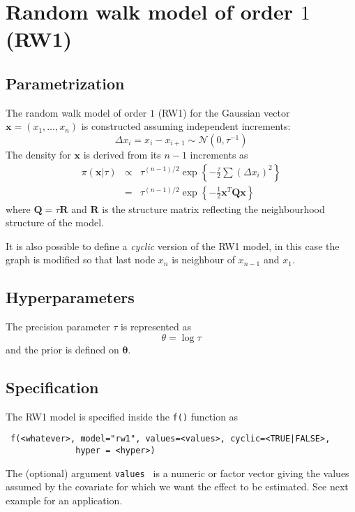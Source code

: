 \documentclass[a4paper,11pt]{article}
\begin{document}
\section*{Random walk model of order $1$ (RW1)}

\subsection*{Parametrization}

The random walk model of order $1$ (RW1) for the Gaussian vector
$\mathbf{x}=(x_1,\dots,x_n)$ is constructed assuming independent
increments:
\[
\Delta x_i = x_i-x_{i+1}\sim\mathcal{N}(0,\tau^{-1})
\]
The density for $\mathbf{x}$ is derived from its $n-1$ increments as
\begin{eqnarray}
    \pi(\mathbf{x}|\tau) &\propto& \tau^{(n-1)/2}
    \exp\left\{-\frac{\tau}{2}\sum (\Delta x_i)^2\right\}\\
    & = &\tau^{(n-1)/2}\exp\left\{-\frac{1}{2}
      \mathbf{x}^T\mathbf{Q}\mathbf{x} \right\}
\end{eqnarray}
where $\mathbf{Q}=\tau\mathbf{R}$ and $\mathbf{R}$ is the structure
matrix reflecting the neighbourhood structure of the model.

It is also possible to define a {\it cyclic} version of the RW1 model,
in this case the graph is modified so that last node $x_n$ is
neighbour of $x_{n-1}$ and $x_1$.
\subsection*{Hyperparameters}

The precision parameter $\tau$ is represented as
\begin{displaymath}
    \theta =\log \tau
\end{displaymath}
and the prior is defined on $\mathbf{\theta}$.

\subsection*{Specification}

The RW1 model is specified inside the {\tt f()} function as
\begin{verbatim}
 f(<whatever>, model="rw1", values=<values>, cyclic=<TRUE|FALSE>,
              hyper = <hyper>)
\end{verbatim}
The (optional) argument {\tt values } is a numeric or factor vector
giving the values assumed by the covariate for which we want the
effect to be estimated. See next example for an application.
 
\end{document}
